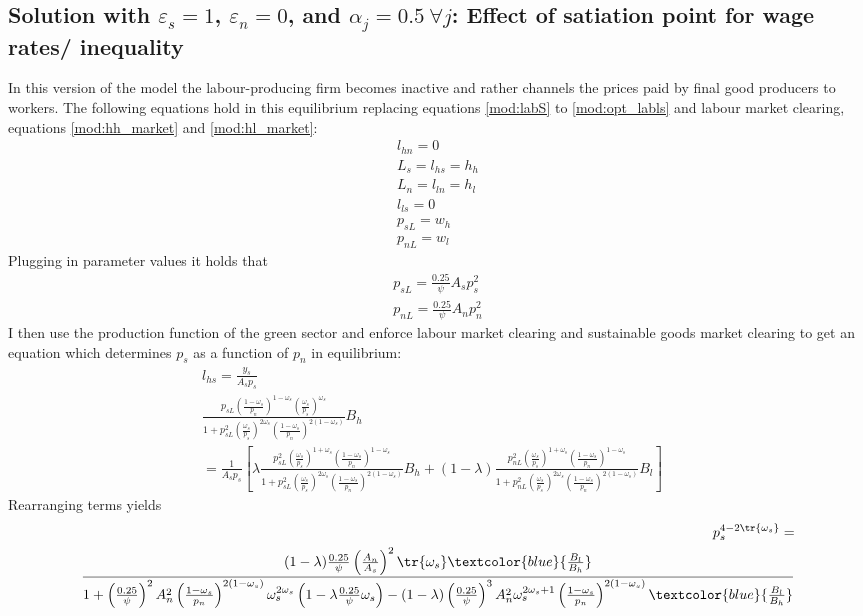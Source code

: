 \subsection{Solution with $\varepsilon_s=1$, $\varepsilon_n=0$, and $\alpha_j=0.5\ \forall j$: Effect of satiation point for wage rates/ inequality}
In this version of the model the labour-producing firm becomes inactive and rather channels the prices paid by final good producers to workers.
The following equations hold in this equilibrium replacing equations \ref{mod:labS} to \ref{mod:opt_labls} and labour market clearing, equations \ref{mod:hh_market} and \ref{mod:hl_market}:
\begin{align}
l_{hn}=0\\
L_s=l_{hs}=h_h\\
L_n=l_{ln}=h_l\\
l_{ls}=0\\
p_{sL}=w_h\\
p_{nL}=w_l
\end{align}
Plugging in parameter values it holds that 
\begin{align}
p_{sL}=\frac{0.25}{\psi}A_sp_{s}^2\\
p_{nL}=\frac{0.25}{\psi}A_np_{n}^2
\end{align}
I then use the production function of the green sector and enforce labour market clearing and  sustainable goods market clearing to get an equation which determines $p_s$ as a function of $p_{n}$ in equilibrium:
\begin{align*}
l_{hs}=\frac{y_s}{A_sp_s}\\
\frac{p_{sL}\left(\frac{1-\omega_s}{p_n}\right)^{1-\omega_s}\left(\frac{\omega_s}{p_s}\right)^{\omega_s}}{1+p_{sL}^2\left(\frac{\omega_s}{p_s}\right)^{2\omega_s}\left(\frac{1-\omega_s}{p_n}\right)^{2(1-\omega_s)}}B_h&\\ =\frac{1}{A_sp_s}\left[\lambda\frac{p_{sL}^2\left(\frac{\omega_s}{p_s}\right)^{1+\omega_s}\left(\frac{1-\omega_s}{p_n}\right)^{1-\omega_s}}{1+p_{sL}^2\left(\frac{\omega_s}{p_s}\right)^{2\omega_s}\left(\frac{1-\omega_s}{p_n}\right)^{2(1-\omega_s)}}B_h+(1-\lambda)\frac{p_{nL}^2\left(\frac{\omega_s}{p_s}\right)^{1+\omega_s}\left(\frac{1-\omega_s}{p_n}\right)^{1-\omega_s}}{1+p_{nL}^2\left(\frac{\omega_s}{p_s}\right)^{2\omega_s}\left(\frac{1-\omega_s}{p_n}\right)^{2(1-\omega_s)}}B_l\right]
\end{align*}
Rearranging terms yields
\begin{align*}
	p_s^{4-2\tr{\omega_s}}=\nonumber \\
	\frac{(1-\lambda)\frac{0.25}{\psi}\left(\frac{A_n}{A_s}\right)^2\tr{\omega_s}\textcolor{blue}{\frac{B_l}{B_h}}}{1+\left(\frac{0.25}{\psi}\right)^2A_n^2\left(\frac{1-\omega_s}{p_n}\right)^{2(1-\omega_s)}\omega_s^{2\omega_s}\left(1-\lambda\frac{0.25}{\psi}\omega_s\right)-(1-\lambda)\left(\frac{0.25}{\psi}\right)^3A_n^2\omega_s^{2\omega_s+1}\left(\frac{1-\omega_s}{p_n}\right)^{2(1-\omega_s)}\textcolor{blue}{\frac{B_l}{B_h}}}
\end{align*}
